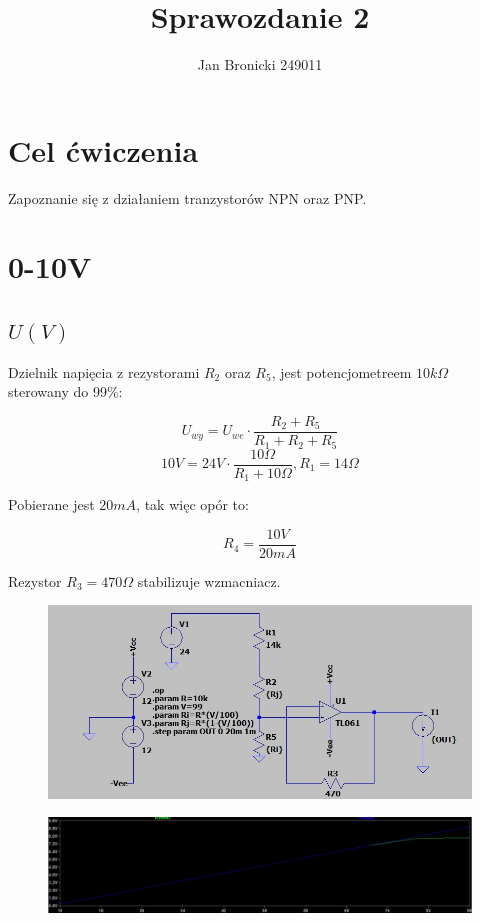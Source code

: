 \documentclass{article}
\title{Sprawozdanie 2}
\author{Jan Bronicki 249011}
\date{}
\begin{document}
\maketitle



\section{Cel ćwiczenia}
Zapoznanie się z działaniem tranzystorów NPN oraz PNP.

\section{0-10V}
\subsection{$U(V)$}

Dzielnik napięcia z rezystorami $R_{2}$ oraz $R_{5}$, jest potencjometreem $10k\Omega$ sterowany do 99\%:

$$
    U_{wy} = U_{we} \cdot \frac{R_{2}+R_{5}}{R_{1}+R_{2}+R_{5}}
$$
$$
    10V = 24V\cdot \frac{10\Omega}{R_{1}+10\Omega}, R_{1}=14\Omega
$$

Pobierane jest $20mA$, tak więc opór to:

$$
    R_{4} = \frac{10V}{20mA}
$$

Rezystor $R_{3}=470\Omega$ stabilizuje wzmacniacz.

\begin{figure}[h!]
    \centering
    \includegraphics[scale=0.5]{rys1_model.jpg}
\end{figure}

\newpage

\begin{figure}[h!]
    \centering
    \includegraphics[scale=0.35]{rys1_wykres.jpg}
\end{figure}
\end{document}
